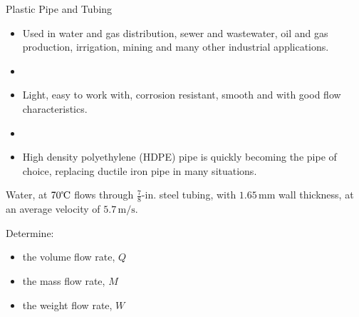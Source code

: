 \documentclass[9pt,xcolor={svgnames, x11names},professionalfonts, mathserif]{beamer}
\begin{document}
\begin{frame}{Plastic Pipe and Tubing}
	\begin{itemize}
		\item Used in water and gas distribution, sewer and wastewater, oil and gas production, irrigation,  mining and
		      many other industrial applications.
		\item[]
		\item Light, easy to work with, corrosion resistant, smooth and with good flow characteristics.
		\item[]
		\item High density polyethylene (HDPE) pipe is quickly becoming the pipe of choice, replacing ductile iron pipe in
		      many situations.
		      
	\end{itemize}
\end{frame}


\begin{frame}
	\begin{center}
		\begin{minipage}{0.6\textwidth}
			
			\begin{myexam}{}{}
				Water, at $70\text{\textcelsius}$ flows through $\tfrac78\text{-in.}$ steel tubing, with $1.65\,\text{mm}$ wall thickness,
				at an average velocity of $5.7\,\text{m/s}$.
				
				Determine:
				\begin{itemize}
					\item the volume flow rate, $Q$
					\item the mass flow rate, $M$
					\item the weight flow rate, $W$
				\end{itemize}
			\end{myexam}
		\end{minipage}
	\end{center}
\end{frame}

\end{document}
